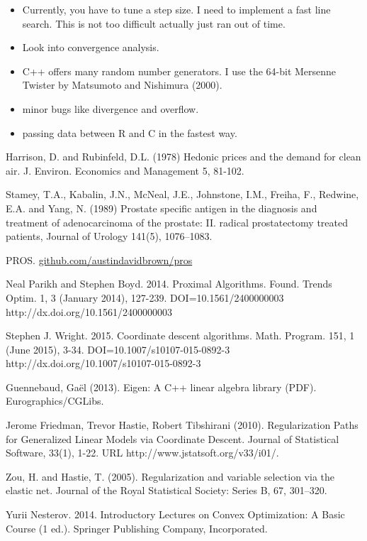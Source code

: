 \documentclass[10pt, reqno]{article}
\numberwithin{equation}{section}
\begin{document}
\begin{itemize}

\item Currently, you have to tune a step size. I need to implement a fast line search. This is not too difficult actually just ran out of time.

\item Look into convergence analysis.

\item C++ offers many random number generators. I use the 64-bit Mersenne Twister by Matsumoto and Nishimura (2000).

\item minor bugs like divergence and overflow.

\item passing data between R and C in the fastest way.

\end{itemize}

%
%
\newpage
\small
\begin{thebibliography}{1}

Harrison, D. and Rubinfeld, D.L. (1978) Hedonic prices and the
     demand for clean air.  J. Environ. Economics and Management 5,
     81-102.

Stamey, T.A., Kabalin, J.N., McNeal, J.E., Johnstone, I.M., Freiha, F., Redwine, E.A. and Yang, N. (1989)
Prostate specific antigen in the diagnosis and treatment of adenocarcinoma of the prostate: II. radical prostatectomy treated patients, Journal of Urology 141(5), 1076–1083.

PROS. \href{https://github.com/austindavidbrown/pros}{github.com/austindavidbrown/pros}

Neal Parikh and Stephen Boyd. 2014. Proximal Algorithms. Found. Trends Optim. 1, 3 (January 2014), 127-239. DOI=10.1561/2400000003 http://dx.doi.org/10.1561/2400000003

Stephen J. Wright. 2015. Coordinate descent algorithms. Math. Program. 151, 1 (June 2015), 3-34. DOI=10.1007/s10107-015-0892-3 http://dx.doi.org/10.1007/s10107-015-0892-3

Guennebaud, Gaël (2013). Eigen: A C++ linear algebra library (PDF). Eurographics/CGLibs.

Jerome Friedman, Trevor Hastie, Robert Tibshirani (2010). Regularization Paths for Generalized Linear Models via Coordinate Descent. Journal of Statistical Software, 33(1), 1-22. URL http://www.jstatsoft.org/v33/i01/.

Zou, H. and Hastie, T. (2005). Regularization and variable selection via the elastic net. Journal of the Royal Statistical Society: Series B, 67, 301–320.

Yurii Nesterov. 2014. Introductory Lectures on Convex Optimization: A Basic Course (1 ed.). Springer Publishing Company, Incorporated.

\end{thebibliography}
\end{document}
